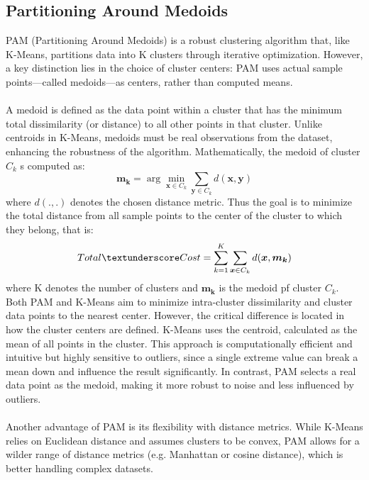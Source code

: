 \subsection{Partitioning Around Medoids}\label{subsec:PAM}
PAM (Partitioning Around Medoids) is a robust clustering algorithm that, like K-Means, partitions data into K clusters through iterative optimization. However, a key distinction lies in the choice of cluster centers: PAM uses actual sample points—called medoids—as centers, rather than computed means.\\
\\
A medoid is defined as the data point within a cluster that has the minimum total dissimilarity (or distance) to all other points in that cluster. Unlike centroids in K-Means, medoids must be real observations from the dataset, enhancing the robustness of the algorithm. Mathematically, the medoid of cluster $C_k$ s computed as:\\
\begin{equation}
	\boldsymbol{m_k}=\arg \min_{\boldsymbol{x} \in C_k} \sum_{\boldsymbol{y} \in C_k} d(\boldsymbol{x},\boldsymbol{y})
\end{equation}
where $d(.,.)$ denotes the chosen distance metric.
Thus the goal is to minimize the total distance from all sample points to the center of the cluster to which they belong, that is:\\
\begin{equation}
	Total\textunderscore Cost=\sum_{k=1}^K\sum_{\boldsymbol{x} \in C_k} d(\boldsymbol{x},\boldsymbol{m_k})
\end{equation}
where K denotes the number of clusters and $\boldsymbol{m_k}$ is the medoid pf cluster $C_k$.\\
Both PAM and K-Means aim to minimize intra-cluster dissimilarity and cluster data points to the nearest center. However, the critical difference is located in how the cluster centers are defined. K-Means uses the centroid, calculated as the mean of all points in the cluster. This approach is computationally efficient and intuitive but highly sensitive to outliers, since a single extreme value can break a mean down and influence the result significantly. In contrast, PAM selects a real data point as the medoid, making it more robust to noise and less influenced by outliers.\\
\\
Another advantage of PAM is its flexibility with distance metrics. While K-Means relies on Euclidean distance and assumes clusters to be convex, PAM allows for a wilder range of distance metrics (e.g. Manhattan or cosine distance), which is better handling complex datasets.\\
